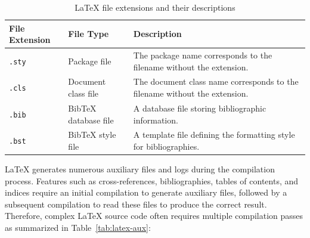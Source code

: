 \begin{table}[htbp]
    \centering
    \caption{\LaTeX{} file extensions and their descriptions}
    \label{tab:latex-ext}
    \begin{tabular}{llp{7.5cm}}
        \toprule
        \textbf{File Extension} & \textbf{File Type}   & \textbf{Description}                                                       \\
        \midrule
        \texttt{.sty}           & Package file         & The package name corresponds to the filename without the extension.        \\
        \texttt{.cls}           & Document class file  & The document class name corresponds to the filename without the extension. \\
        \texttt{.bib}           & BibTeX database file & A database file storing bibliographic information.                         \\
        \texttt{.bst}           & BibTeX style file    & A template file defining the formatting style for bibliographies.          \\
        \bottomrule
    \end{tabular}
\end{table}

\LaTeX{} generates numerous auxiliary files and logs during the compilation process. Features such as cross-references, bibliographies, tables of contents, and indices require an initial compilation to generate auxiliary files, followed by a subsequent compilation to read these files to produce the correct result. Therefore, complex \LaTeX{} source code often requires multiple compilation passes as summarized in Table~\ref{tab:latex-aux}:


